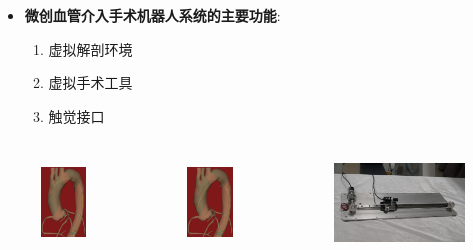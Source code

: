 \begin{frame}
\begin{itemize}
  \item \textbf{微创血管介入手术机器人系统的主要功能}: 
  \begin{enumerate}
    \item 虚拟解剖环境
    \item 虚拟手术工具
    \item 触觉接口
  \end{enumerate}
\end{itemize}
\begin{columns}[b,onlytextwidth]
\begin{column}{.25\textwidth}
\begin{figure}[t]
\centering
\includegraphics[height=1.0in]{../../Figures/background/simulation2.eps}
\end{figure}
\end{column}
\begin{column}{.25\textwidth}
\begin{figure}[t]
\centering
\includegraphics[height=1.0in]{../../Figures/background/simulation.eps}
\end{figure}
\end{column}
\begin{column}{.5\textwidth}
\begin{figure}[t]
\centering
\includegraphics[height=1.0in]{../../Figures/background/interface.eps}
\end{figure}
\end{column}
\end{columns}
\end{frame}

